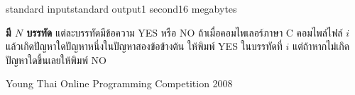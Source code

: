 \documentclass[11pt,a4paper]{article}
\begin{document}
\begin{problem}{}{standard input}{standard output}{1 second}{16 megabytes}
\OutputFile

\textbf{มี $N$ บรรทัด} แต่ละบรรทัดมีข้อความ YES หรือ NO ถ้าเมื่อคอมไพเลอร์ภาษา C คอมไพล์ไฟล์ $i$ แล้วเกิดปัญหาใดปัญหาหนึ่งในปัญหาสองข้อข้างต้น ให้พิมพ์ YES ในบรรทัดที่ $i$ แต่ถ้าหากไม่เกิดปัญหาใดขึ้นเลยให้พิมพ์ NO


\Examples

\begin{example}
%
%
%
\end{example}


\Source

Young Thai Online Programming Competition 2008

\end{problem}
\end{document}
